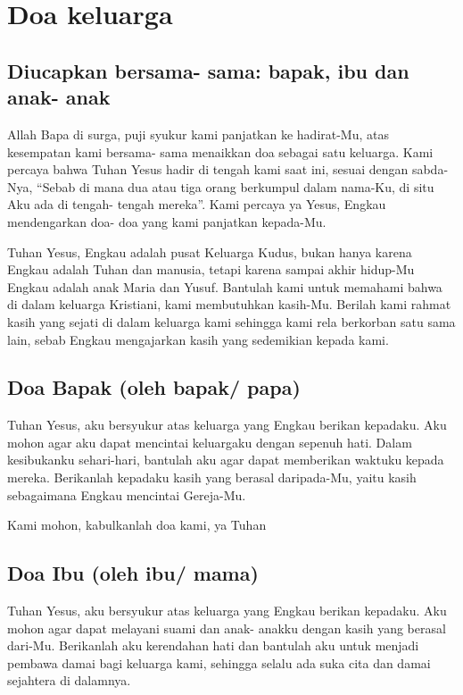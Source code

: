 \documentclass[a5paper,headsepline,titlepage,11pt,nnormalheadings,DIVcalc]{scrbook}
\begin{document}
\chapter*{Doa keluarga} 

\section*{Diucapkan bersama- sama: bapak, ibu dan anak- anak}

Allah Bapa di surga, puji syukur kami panjatkan ke hadirat-Mu, atas kesempatan kami bersama- sama menaikkan doa sebagai satu keluarga. Kami percaya bahwa Tuhan Yesus hadir di tengah kami saat ini, sesuai dengan sabda-Nya, ``Sebab di mana dua atau tiga orang berkumpul dalam nama-Ku, di situ Aku ada di tengah- tengah mereka''. Kami percaya ya Yesus, Engkau mendengarkan doa- doa yang kami panjatkan kepada-Mu.

Tuhan Yesus, Engkau adalah pusat Keluarga Kudus, bukan hanya karena Engkau adalah Tuhan dan manusia, tetapi karena sampai akhir hidup-Mu Engkau adalah anak Maria dan Yusuf. Bantulah kami untuk memahami bahwa di dalam keluarga Kristiani, kami membutuhkan kasih-Mu. Berilah kami rahmat kasih yang sejati di dalam keluarga kami sehingga kami rela berkorban satu sama lain, sebab Engkau mengajarkan kasih yang sedemikian kepada kami.

\section*{Doa Bapak (oleh bapak/ papa)}
Tuhan Yesus, aku bersyukur atas keluarga yang Engkau berikan kepadaku. Aku mohon agar aku dapat mencintai keluargaku dengan sepenuh hati. Dalam kesibukanku sehari-hari, bantulah aku agar dapat memberikan waktuku kepada mereka. Berikanlah kepadaku kasih yang berasal daripada-Mu, yaitu kasih sebagaimana Engkau mencintai Gereja-Mu.

Kami mohon, kabulkanlah doa kami, ya Tuhan

\section*{Doa Ibu (oleh ibu/ mama)}
Tuhan Yesus, aku bersyukur atas keluarga yang Engkau berikan kepadaku. Aku mohon agar dapat melayani suami dan anak- anakku dengan kasih yang berasal dari-Mu. Berikanlah aku kerendahan hati dan bantulah aku untuk menjadi pembawa damai bagi keluarga kami, sehingga selalu ada suka cita dan damai sejahtera di dalamnya.
\end{document}

